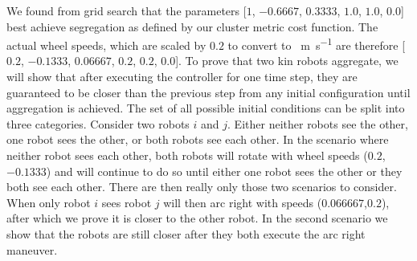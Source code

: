 \documentclass[conference]{IEEEtran}
\begin{document}
    We found from grid search that the parameters [$1$, $-0.6667$, $0.3333$, $1.0$, $1.0$, $0.0$] best achieve segregation as defined by our cluster metric cost function. The actual wheel speeds, which are scaled by $0.2$ to convert to \SI{}{\meter\per\second} are therefore [$0.2$, $-0.1333$, $0.06667$, $0.2$, $0.2$, $0.0$]. To prove that two kin robots aggregate, we will show that after executing the controller for one time step, they are guaranteed to be closer than the previous step from any initial configuration until aggregation is achieved. The set of all possible initial conditions can be split into three categories. Consider two robots $i$ and $j$. Either neither robots see the other, one robot sees the other, or both robots see each other. In the scenario where neither robot sees each other, both robots will rotate with wheel speeds ($0.2$,$-0.1333$) and will continue to do so until either one robot sees the other or they both see each other. There are then really only those two scenarios to consider. When only robot $i$ sees robot $j$ will then arc right with speeds ($0.066667$,$0.2$), after which we prove it is closer to the other robot. In the second scenario we show that the robots are still closer after they both execute the arc right maneuver.
\end{document}
